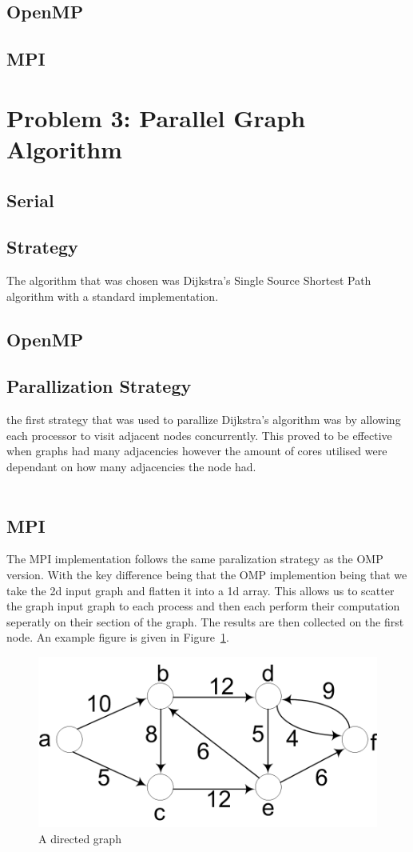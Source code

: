 \subsection{OpenMP} 
\subsection{MPI}
\pagebreak
\section{Problem 3: Parallel Graph Algorithm}
\subsection{Serial}
\subsection*{Strategy}
The algorithm that was chosen was Dijkstra's Single Source Shortest Path algorithm with a standard implementation.
\subsection{OpenMP}
\subsection*{Parallization Strategy}
the first strategy that was used to parallize Dijkstra's algorithm was by allowing each processor to visit adjacent nodes concurrently. This proved to be effective when graphs had many adjacencies however the amount of cores utilised were dependant on how many adjacencies the node had.\\\\

\subsection{MPI}
The MPI implementation follows the same paralization strategy as the OMP version. With the key difference being that the OMP implemention being that we take the 2d input graph and flatten it into a 1d array. This allows us to scatter the graph input graph to each process and then each perform their computation seperatly on their section of the graph. The results are then collected on the first node. 
An example figure is given in Figure~\ref{fig:sp_fig1}.
\begin{figure}[htb]
	\centering
	\includegraphics[width=0.5\linewidth]{pics/sp_fig1.png}
	\caption{A directed graph}\label{fig:sp_fig1}
\end{figure}

